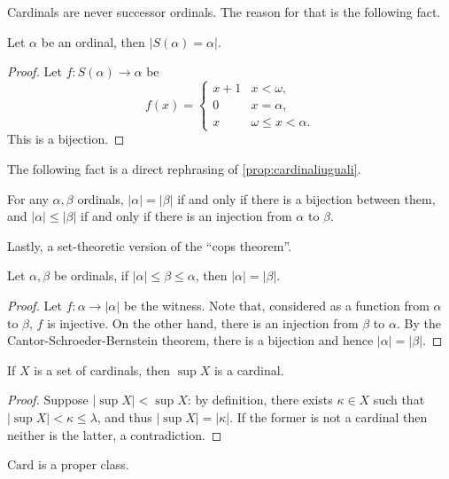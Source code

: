 \documentclass[twoside,openright,titlepage,numbers=noenddot,%
               headinclude,footinclude,cleardoublepage=empty,abstract=on,
               BCOR=23mm,paper=letter,fontsize=11pt
               ]{scrreprt}
\begin{document}
Cardinals are never successor ordinals. The reason for that is the following fact.
\begin{proposition}
    Let $\alpha$ be an ordinal, then $\vert S(\alpha) = \alpha\vert$.
\end{proposition}
\begin{proof}
    Let $f: S(\alpha) \to \alpha$ be
    \begin{equation*}
        f(x) = 
        \begin{cases}
            x+1 & x < \omega, \\
            0 & x = \alpha, \\
            x & \omega \leq x < \alpha.
        \end{cases}
    \end{equation*}
    This is a bijection.
\end{proof}
The following fact is a direct rephrasing of \ref{prop:cardinaliuguali}.
\begin{proposition}
    For any $\alpha,\beta$ ordinals, $\vert \alpha \vert = \vert \beta \vert$ if and only if there is a bijection between them, and $\vert \alpha\vert \leq \vert \beta \vert$ if and only if there is an injection from $\alpha$ to $\beta$.
\end{proposition}
Lastly, a set-theoretic version of the ``cops theorem''.
\begin{proposition}
    Let $\alpha,\beta$ be ordinals, if $\vert \alpha\vert \leq \beta \leq \alpha$, then $\vert \alpha \vert = \vert \beta \vert$.
\end{proposition}
\begin{proof}
    Let $f: \alpha \to \vert \alpha \vert$ be the witness. Note that, considered as a function from $\alpha$ to $\beta$, $f$ is injective. On the other hand, there is an injection from $\beta$ to $\alpha$. By the Cantor-Schroeder-Bernstein theorem, there is a bijection and hence $\vert \alpha \vert = \vert \beta \vert$.
\end{proof}
\begin{corollary}
    If $X$ is a set of cardinals, then $\sup X$ is a cardinal.
\end{corollary}
\begin{proof}
    Suppose $\vert \sup X \vert < \sup X$: by definition, there exists $\kappa \in X$ such that $\vert \sup X \vert < \kappa \leq \lambda$, and thus $\vert \sup X \vert = \vert \kappa \vert$. If the former is not a cardinal then neither is the latter, a contradiction.
\end{proof}
\begin{corollary}
    $\mathrm{Card}$ is a proper class.
\end{corollary}
\end{document}
